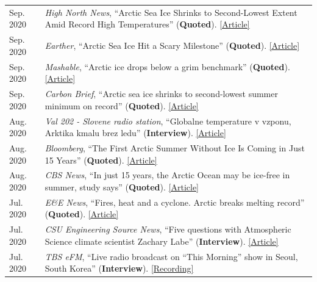 \documentclass[margin,line,palatino,courier,10pt]{res}
\begin{document}
\begin{resume}
\begin{tabular}{@{}p{0.9in}p{4in}}
Sep. 2020 & \textit{High North News}, ``Arctic Sea Ice Shrinks to Second-Lowest Extent Amid Record High Temperatures'' (\textbf{Quoted}). \href{https://www.highnorthnews.com/en/arctic-sea-ice-shrinks-second-lowest-extent-amid-record-high-temperatures}{[Article]}\\
Sep. 2020 & \textit{Earther}, ``Arctic Sea Ice Hit a Scary Milestone'' (\textbf{Quoted}). \href{https://earther.gizmodo.com/arctic-sea-ice-hit-a-scary-milestone-1845133739}{[Article]}\\
Sep. 2020 & \textit{Mashable}, ``Arctic ice drops below a grim benchmark'' (\textbf{Quoted}). \href{https://mashable.com/article/arctic-sea-ice-decline-2020/}{[Article]}\\
Sep. 2020 & \textit{Carbon Brief}, ``Arctic sea ice shrinks to second-lowest summer minimum on record'' (\textbf{Quoted}). \href{https://www.carbonbrief.org/arctic-sea-ice-shrinks-to-second-lowest-summer-minimum-on-record}{[Article]}\\
Aug. 2020 & \textit{Val 202 - Slovene radio station}, ``Globalne temperature v vzponu, Arktika kmalu brez ledu'' (\textbf{Interview}). \href{https://val202.rtvslo.si/2020/08/aktualno-20/}{[Article]}\\
Aug. 2020 & \textit{Bloomberg}, ``The First Arctic Summer Without Ice Is Coming in Just 15 Years'' (\textbf{Quoted}). \href{https://www.bloomberg.com/news/articles/2020-08-17/the-first-arctic-summer-without-ice-is-coming-in-just-15-years?srnd=premium}{[Article]}\\
Aug. 2020 & \textit{CBS News}, ``In just 15 years, the Arctic Ocean may be ice-free in summer, study says'' (\textbf{Quoted}). \href{https://www.cbsnews.com/news/arctic-ocean-climate-change-ice-free-15-years/}{[Article]}\\
Jul. 2020 & \textit{E\&E News}, ``Fires, heat and a cyclone. Arctic breaks melting record'' (\textbf{Quoted}). \href{https://www.eenews.net/stories/1063658765}{[Article]}\\
Jul. 2020 & \textit{CSU Engineering Source News}, ``Five questions with Atmospheric Science climate scientist Zachary Labe'' (\textbf{Interview}). \href{https://engr.source.colostate.edu/five-questions-with-climate-scientist-zachary-labe/}{[Article]}\\
Jul. 2020 & \textit{TBS eFM}, ``Live radio broadcast on “This Morning” show in Seoul, South Korea'' (\textbf{Interview}). \href{https://podcasts.apple.com/kr/podcast/0724-in-focus-1-effects-human-induced-climate-change/id1038822609?i=1000485914634&l=en}{[Recording]}\\

\end{tabular}
\end{resume}
\end{document}
